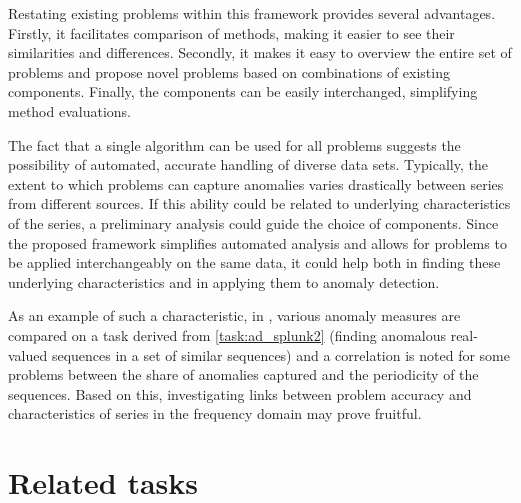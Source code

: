 Restating existing problems within this framework provides several advantages. Firstly, it facilitates comparison of methods, making it easier to see their similarities and differences. Secondly, it makes it easy to overview the entire set of problems and propose novel problems based on combinations of existing components. Finally, the components can be easily interchanged, simplifying method evaluations.

The fact that a single algorithm can be used for all problems suggests the possibility of automated, accurate handling of diverse data sets. Typically, the extent to which problems can capture anomalies varies drastically between series from different sources. If this ability could be related to underlying characteristics of the series, a preliminary analysis could guide the choice of components. Since the proposed framework simplifies automated analysis and allows for problems to be applied interchangeably on the same data, it could help both in finding these underlying characteristics and in applying them to anomaly detection.

As an example of such a characteristic, in \cite{chandola3}, various anomaly measures are compared on a task derived from \ref{task:ad_splunk2} (finding anomalous real-valued sequences in a set of similar sequences) and a correlation is noted for some problems between the share of anomalies captured and the periodicity of the sequences. Based on this, investigating links between problem accuracy and characteristics of series in the frequency domain may prove fruitful.

\section{Related tasks}
\label{sect:related_tasks_framework}

